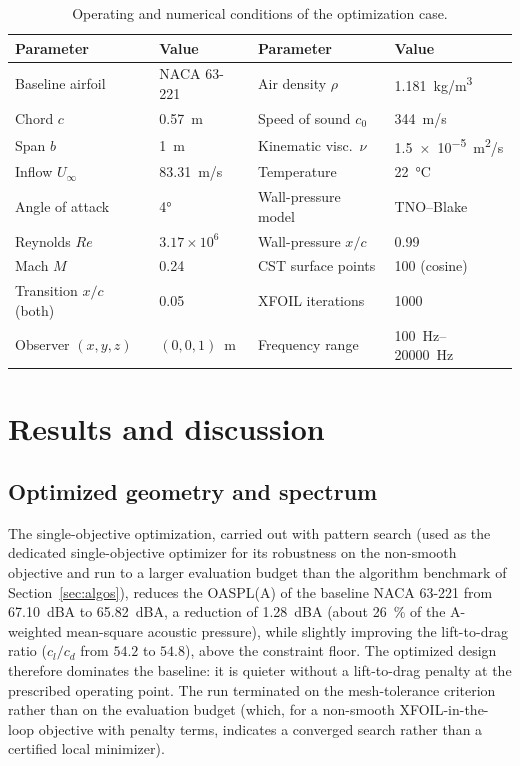 \documentclass[preprint,3p,times]{elsarticle}
\begin{document}
\begin{table}[!htbp]\centering
\caption{Operating and numerical conditions of the optimization case.}
\label{tab:cond}
\begin{tabular}{@{}llll@{}}
\toprule
Parameter & Value & Parameter & Value \\
\midrule
Baseline airfoil       & NACA 63-221        & Air density $\rho$    & \SI{1.181}{kg/m^3} \\
Chord $c$              & \SI{0.57}{m}       & Speed of sound $c_0$  & \SI{344}{m/s} \\
Span $b$               & \SI{1}{m}          & Kinematic visc.\ $\nu$& \SI{1.5e-5}{m^2/s} \\
Inflow $U_\infty$      & \SI{83.31}{m/s}    & Temperature           & \SI{22}{\celsius} \\
Angle of attack        & \ang{4}            & Wall-pressure model   & TNO--Blake \\
Reynolds $Re$          & $3.17\times10^6$   & Wall-pressure $x/c$   & 0.99 \\
Mach $M$               & 0.24               & CST surface points    & 100 (cosine) \\
Transition $x/c$ (both)& 0.05               & XFOIL iterations      & 1000 \\
Observer $(x,y,z)$     & $(0,0,1)$~m        & Frequency range       & \SIrange{100}{20000}{Hz} \\
\bottomrule
\end{tabular}
\end{table}

\section{Results and discussion}\label{sec:res}
\subsection{Optimized geometry and spectrum}
The single-objective optimization, carried out with pattern search (used as the
dedicated single-objective optimizer for its robustness on the non-smooth
objective and run to a larger evaluation budget than the algorithm benchmark of
Section~\ref{sec:algos}), reduces the OASPL(A) of the baseline NACA 63-221 from
\SI{67.10}{dBA} to \SI{65.82}{dBA}, a reduction of \SI{1.28}{dBA} (about
\SI{26}{\percent} of the A-weighted mean-square acoustic pressure), while slightly improving
the lift-to-drag ratio ($c_l/c_d$ from $54.2$ to $54.8$), above the constraint
floor. The optimized design therefore dominates the baseline: it is quieter
without a lift-to-drag penalty at the prescribed operating point. The run
terminated on the mesh-tolerance criterion rather than on the evaluation budget
(which, for a non-smooth XFOIL-in-the-loop objective with penalty terms,
indicates a converged search rather than a certified local minimizer).
\end{document}
